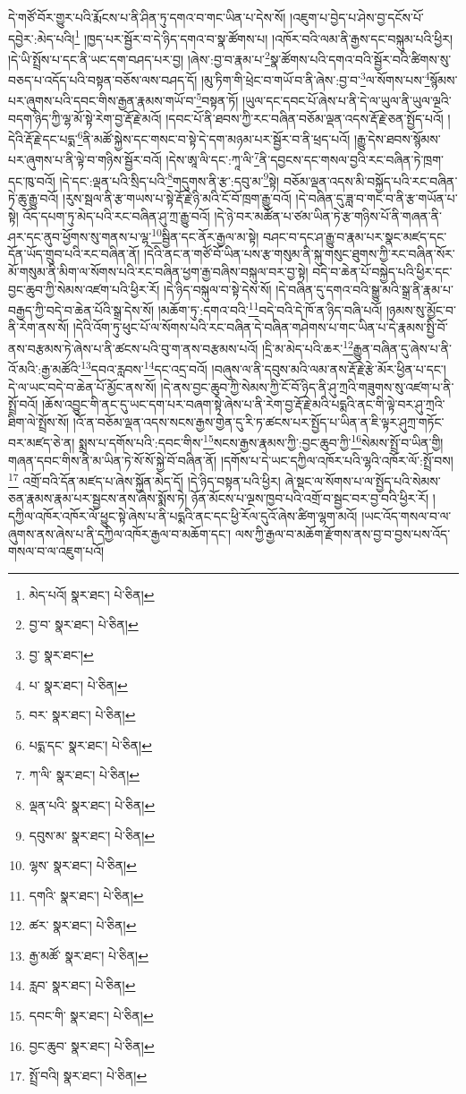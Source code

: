 དེ་གཙོ་བོར་གྱུར་པའི་རྨོངས་པ་ནི་ཤིན་ཏུ་དགའ་བ་གང་ཡིན་པ་དེས་སོ། །འཇུག་པ་བྱེད་པ་ཤེས་བྱ་དངོས་པོ་དབྱེར་:མེད་པའི།\footnote{མེད་པའོ།  སྣར་ཐང་།  པེ་ཅིན། } །ཁྱད་པར་སྦྱོར་བ་དེ་ཉིད་དགའ་བ་སྣ་ཚོགས་པ། །འཁོར་བའི་ལམ་ནི་རྒྱས་དང་བསྐུམ་པའི་ཕྱིར། །དེ་ཡི་སྤྲོས་པ་དང་ནི་ཡང་དག་བཤད་པར་བྱ། །ཞེས་:བྱ་བ་རྣམ་པ་\footnote{བྱ་བ་  སྣར་ཐང་།  པེ་ཅིན། }སྣ་ཚོགས་པའི་དགའ་བའི་སྦྱོར་བའི་ཚིགས་སུ་བཅད་པ་འདོད་པའི་བསྟན་བཅོས་ལས་བཤད་དོ། །མུ་ཏིག་གི་ཕྲེང་བ་གཡོ་བ་ནི་ཞེས་:བྱ་བ་\footnote{བྱ་  སྣར་ཐང་། }ལ་སོགས་པས་\footnote{པ་  སྣར་ཐང་།  པེ་ཅིན། }སྙོམས་པར་ཞུགས་པའི་དབང་གིས་རྒྱན་རྣམས་གཡོ་བ་\footnote{བར་  སྣར་ཐང་།  པེ་ཅིན། }བསྟན་ཏོ། །ཡུལ་དང་དབང་པོ་ཞེས་པ་ནི་དེ་ལ་ཡུལ་ནི་ཡུལ་ལྔའི་བདག་ཉིད་ཀྱི་ལྷ་མོ་སྟེ་རེག་བྱ་རྡོ་རྗེ་མའོ། །དབང་པོ་ནི་ཐབས་ཀྱི་རང་བཞིན་བཅོམ་ལྡན་འདས་རྡོ་རྗེ་ཅན་སྤྱོད་པའོ། །དེའི་རྡོ་རྗེ་དང་པདྨ་\footnote{པདྨ་དང་  སྣར་ཐང་།  པེ་ཅིན། }ནི་མཚོ་སྐྱེས་དང་གསང་བ་སྟེ་དེ་དག་མཉམ་པར་སྦྱོར་བ་ནི་ཕྲད་པའོ། །རྒྱུ་དེས་ཐབས་སྙོམས་པར་ཞུགས་པ་ནི་ལྟེ་བ་གཉིས་སྦྱོར་བའོ། །དེས་ཨཱ་ལི་དང་:ཀཱ་ལི་\footnote{ཀ་ལི་  སྣར་ཐང་།  པེ་ཅིན། }ནི་དབྱངས་དང་གསལ་བྱའི་རང་བཞིན་ཏེ་ཁྲག་དང་ཁུ་བའོ། །དེ་དང་:ལྡན་པའི་སྲིད་པའི་\footnote{ལྡན་པའི་  སྣར་ཐང་།  པེ་ཅིན། }གདུགས་ནི་རྩ་:དབུ་མ་\footnote{དབུས་མ་  སྣར་ཐང་།  པེ་ཅིན། }སྟེ། བཅོམ་ལྡན་འདས་མི་བསྐྱོད་པའི་རང་བཞིན་ཏེ་ཆུ་རྒྱུ་བའོ། །རུས་སྦལ་ནི་རྩ་གཡས་པ་སྟེ་རྡོ་རྗེ་ཉི་མའི་ངོ་བོ་ཁྲག་རྒྱུ་བའོ། །དེ་བཞིན་དུ་ཟླ་བ་གང་བ་ནི་རྩ་གཡོན་པ་སྟེ། འོད་དཔག་ཏུ་མེད་པའི་རང་བཞིན་ཤུ་ཀྲ་རྒྱུ་བའོ། །དེ་ཉེ་བར་མཚོན་པ་ཙམ་ཡིན་ཏེ་རྩ་གཉིས་པོ་ནི་གཞན་ནི་ཤར་དང་ནུབ་ཕྱོགས་སུ་གནས་པ་ལྷ་\footnote{ལྷས་  སྣར་ཐང་།  པེ་ཅིན། }སྦྱིན་དང་ནོར་རྒྱལ་མ་སྟེ། བཤང་བ་དང་ཤ་རྒྱུ་བ་རྣམ་པར་སྣང་མཛད་དང་དོན་ཡོད་གྲུབ་པའི་རང་བཞིན་ནོ། །དེའི་ནང་ན་གཙོ་བོ་ཡིན་པས་རྩ་གསུམ་ནི་སྐུ་གསུང་ཐུགས་ཀྱི་རང་བཞིན་སོར་མོ་གསུམ་ནི་མིག་ལ་སོགས་པའི་རང་བཞིན་ཕྱག་རྒྱ་བཞིས་བསྐུལ་བར་བྱ་སྟེ། བདེ་བ་ཆེན་པོ་བསྐྱེད་པའི་ཕྱིར་དང་བྱང་ཆུབ་ཀྱི་སེམས་འཛག་པའི་ཕྱིར་རོ། །དེ་ཉིད་བསྐུལ་བ་སྟེ་དེས་སོ། །དེ་བཞིན་དུ་དགའ་བའི་སྒྱུ་མའི་སྒྲ་ནི་རྣམ་པ་བརྒྱད་ཀྱི་བདེ་བ་ཆེན་པོའི་སྒྲ་དེས་སོ། །མཆོག་ཏུ་:དགའ་བའི་\footnote{དགའི་  སྣར་ཐང་།  པེ་ཅིན། }བདེ་བའི་དེ་ཁོ་ན་ཉིད་བཞི་པའོ། །ཉམས་སུ་མྱོང་བ་ནི་རེག་ནས་སོ། །དེའི་འོག་ཏུ་ཕུང་པོ་ལ་སོགས་པའི་རང་བཞིན་དེ་བཞིན་གཤེགས་པ་གང་ཡིན་པ་དེ་རྣམས་སྤྱི་བོ་ནས་བརྩམས་ཏེ་ཞེས་པ་ནི་ཚངས་པའི་བུ་ག་ནས་བརྩམས་པའོ། །དྲི་མ་མེད་པའི་ཆར་\footnote{ཚར་  སྣར་ཐང་།  པེ་ཅིན། }རྒྱུན་བཞིན་དུ་ཞེས་པ་ནི་འོ་མའི་:རྒྱ་མཚོའི་\footnote{རྒྱ་མཚོ་  སྣར་ཐང་།  པེ་ཅིན། }དབའ་རླབས་\footnote{རླབ་  སྣར་ཐང་།  པེ་ཅིན། }དང་འདྲ་བའོ། །བཞུས་ལ་ནི་དབུས་མའི་ལམ་ནས་རྡོ་རྗེ་རྩེ་མོར་ཕྱིན་པ་དང་། དེ་ལ་ཡང་བདེ་བ་ཆེན་པོ་མྱོང་ནས་སོ། །དེ་ནས་བྱང་ཆུབ་ཀྱི་སེམས་ཀྱི་ངོ་བོ་ཉིད་ནི་ཤུ་ཀྲའི་གཟུགས་སུ་འཛག་པ་ནི་སྤྲོ་བའོ། །ཆོས་འབྱུང་གི་ནང་དུ་ཡང་དག་པར་བཞག་སྟེ་ཞེས་པ་ནི་རེག་བྱ་རྡོ་རྗེ་མའི་པདྨའི་ནང་གི་ལྟེ་བར་ཤུ་ཀྲའི་ཐིག་ལེ་སྤྲོས་སོ། །འོ་ན་བཅོམ་ལྡན་འདས་སངས་རྒྱས་གྱེན་དུ་རི་ཏ་ཚངས་པར་སྤྱོད་པ་ཡིན་ན་ཇི་ལྟར་ཤུཀྲ་གཏོང་བར་མཛད་ཅེ་ན། སྨྲས་པ་དགོས་པའི་:དབང་གིས་\footnote{དབང་གི་  སྣར་ཐང་།  པེ་ཅིན། }སངས་རྒྱས་རྣམས་ཀྱི་:བྱང་ཆུབ་ཀྱི་\footnote{བྱང་ཆུབ་  སྣར་ཐང་།  པེ་ཅིན། }སེམས་སྤྲོ་བ་ཡིན་གྱི། གཞན་དབང་གིས་ནི་མ་ཡིན་ཏེ་སོ་སོ་སྐྱེ་བོ་བཞིན་ནོ། །དགོས་པ་དེ་ཡང་དཀྱིལ་འཁོར་པའི་ལྷའི་འཁོར་ལོ་:སྤྲོ་བས།\footnote{སྤྲོ་བའི།  སྣར་ཐང་།  པེ་ཅིན། } འགྲོ་བའི་དོན་མཛད་པ་ཞེས་སྐྱོན་མེད་དོ། །དེ་ཉིད་བསྟན་པའི་ཕྱིར། ཞེ་སྡང་ལ་སོགས་པ་ལ་སྤྱོད་པའི་སེམས་ཅན་རྣམས་རྣམ་པར་སྦྱངས་ནས་ཞེས་སྨོས་ཏེ། ཉོན་མོངས་པ་ལྔས་ཁྱབ་པའི་འགྲོ་བ་སྦྱང་བར་བྱ་བའི་ཕྱིར་རོ། །དཀྱིལ་འཁོར་འཁོར་ལོ་ཕྱུང་སྟེ་ཞེས་པ་ནི་པདྨའི་ནང་དང་ཕྱི་རོལ་དུའོ་ཞེས་ཚིག་ལྷག་མའོ། །ཡང་འོད་གསལ་བ་ལ་ཞུགས་ནས་ཞེས་པ་ནི་དཀྱིལ་འཁོར་རྒྱལ་བ་མཆོག་དང་། ལས་ཀྱི་རྒྱལ་བ་མཆོག་རྫོགས་ནས་བྱ་བ་བྱས་པས་འོད་གསལ་བ་ལ་འཇུག་པའོ། 